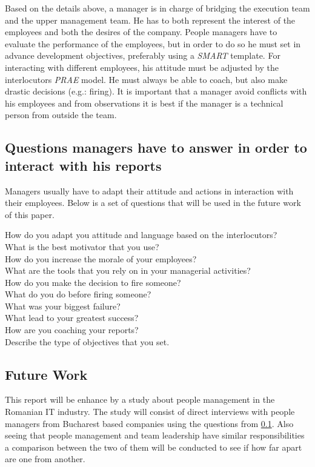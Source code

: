 Based on the details above, a manager is in charge of bridging the execution team and the upper management team. He has to both represent the interest of the employees and both the desires of the company. People managers have to evaluate the performance of the employees, but in order to do so he must set in advance development objectives, preferably using a \textit{SMART} template. For interacting with different employees, his attitude must be adjusted by the interlocutors \textit{PRAE} model. He must always be able to coach, but also make drastic decisions (e.g.: firing). It is important that a manager avoid conflicts with his employees and from observations it is best if the manager is a technical person from outside the team.

\subsection{Questions managers have to answer in order to interact with his reports}
\label{subsec:questions}
Managers usually have to adapt their attitude and actions in interaction with their employees. Below is a set of questions that will be used in the future work of this paper.

\begin{description}
\item[How do you adapt you attitude and language based on the interlocutors?]
\item[What is the best motivator that you use?]
\item[How do you increase the morale of your employees?]
\item[What are the tools that you rely on in your managerial activities?]
\item[How do you make the decision to fire someone?]
\item[What do you do before firing someone?]
\item[What was your biggest failure?]
\item[What lead to your greatest success?]
\item[How are you coaching your reports?]
\item[Describe the type of objectives that you set.]
\end{description}


\subsection{Future Work}
\label{subsec:future}
This report will be enhance by a study about people management in the Romanian IT industry. The study will consist of direct interviews with people managers from Bucharest based companies using the questions from \cref{subsec:questions}. Also seeing that people management and team leadership have similar responsibilities a comparison between the two of them will be conducted to see if how far apart are one from another.

